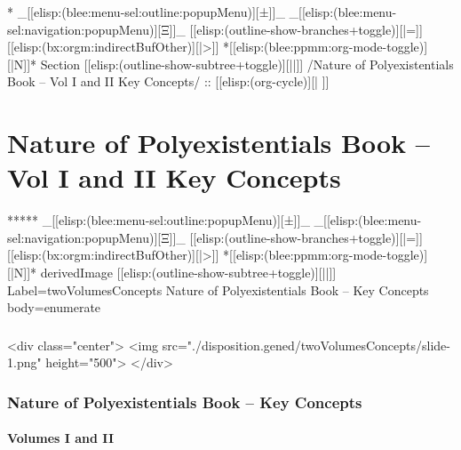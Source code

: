 \begin{whenOrg}
\begin{whenOrg}
*  _[[elisp:(blee:menu-sel:outline:popupMenu)][±]]_ _[[elisp:(blee:menu-sel:navigation:popupMenu)][Ξ]]_ [[elisp:(outline-show-branches+toggle)][|=]] [[elisp:(bx:orgm:indirectBufOther)][|>]] *[[elisp:(blee:ppmm:org-mode-toggle)][|N]]*  Section    [[elisp:(outline-show-subtree+toggle)][||]]   /Nature of Polyexistentials Book -- Vol I and II Key Concepts/ ::  [[elisp:(org-cycle)][| ]]
\end{whenOrg}

\section{Nature of Polyexistentials Book -- Vol I and II Key Concepts}


\begin{whenOrg}
*****  _[[elisp:(blee:menu-sel:outline:popupMenu)][±]]_ _[[elisp:(blee:menu-sel:navigation:popupMenu)][Ξ]]_ [[elisp:(outline-show-branches+toggle)][|=]] [[elisp:(bx:orgm:indirectBufOther)][|>]] *[[elisp:(blee:ppmm:org-mode-toggle)][|N]]*  derivedImage [[elisp:(outline-show-subtree+toggle)][||]] Label=twoVolumesConcepts Nature of Polyexistentials Book -- Key Concepts body=enumerate
\end{whenOrg}

\begin{htmlonly}

\begin{frame}[fragile,plain,label=twoVolumesConcepts]
    \frametitle{}
    \framesubtitle{}
    \begin{rawhtml}
<div class="center">
<img src="./disposition.gened/twoVolumesConcepts/slide-1.png" height="500">
</div>
    \end{rawhtml}
\end{frame}
\end{htmlonly}

\begin{verblatex}

\begin{frame}[fragile,plain,label=twoVolumesConcepts]
    \frametitle{Nature of Polyexistentials Book -- Key Concepts}
    \framesubtitle{Volumes I and II}



\end{frame}
\end{verblatex}
\end{whenOrg}
